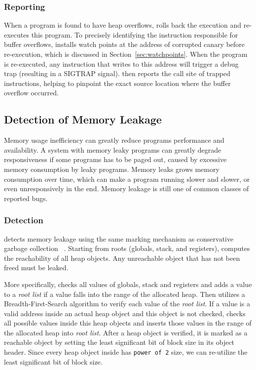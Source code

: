 \subsubsection{Reporting}
\label{sec:overflowreport}
When a program is found to have heap overflows, \doubletake{} rolls back the execution and re-executes this program.
To precisely identifying the instruction responsible for buffer overflows, \doubletake{} installs watch points at the address of corrupted canary before re-execution, which is discussed in Section~\ref{sec:watchpoints}.
When the program is re-executed, any instruction that writes to this address will trigger a debug trap (resulting in a SIGTRAP signal). \doubletake{} then reports the call site of trapped instructions, helping to pinpoint the exact source location where the buffer overflow occurred.
  
\subsection{Detection of Memory Leakage}
\label{sec:leak}
Memory usage inefficiency can greatly reduce programs performance and availability. A system with memory leaky programs can greatly degrade responsiveness if some programs has to be paged out, caused by excessive memory consumption by leaky programs. Memory leaks grows memory consumption over time, which can make a program running slower and slower, or even unresponsively in the end. Memory leakage is still one of common classes of reported bugs.

\subsubsection{Detection}
\doubletake{} detects memory leakage using the same marking mechanism as conservative garbage collection ~\cite{Wilson:1992:UGC:645648.664824}. Starting from roots (globals, stack, and registers), \doubletake{} computes the reachability of all heap objects. Any unreachable object that has not been freed must be leaked.

More specifically, \doubletake{} checks all values of globals, stack and registers and adds a value to a {\it root list} if a value falls into the range of the allocated heap.
Then \doubletake{} utilizes a Breadth-First-Search algorithm to verify each value of the {\it root list}. 
If a value is a valid address inside an actual heap object and this object is not checked, \doubletake{} checks all possible values inside this heap objects and inserts those values 
in the range of the allocated heap into {\it root list}. 
After a heap object is verified, it is marked as a reachable object by setting the least significant bit of block size in its object header. Since every heap object inside \doubletake{} has \texttt{power of 2} size, we can re-utilize the least significant bit of block size. 

